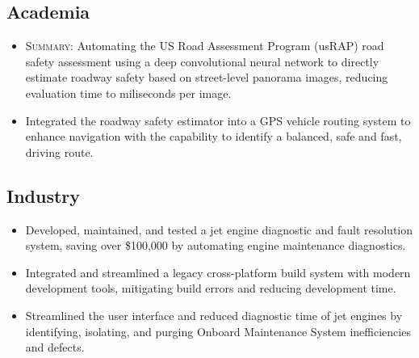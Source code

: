\documentclass[11pt,a4paper,sans]{moderncv} %
\begin{document}
\subsection{Academia}
{
\begin{itemize} 
	\item \textsc{Summary:} Automating the US Road Assessment Program (usRAP) road safety assessment using a deep convolutional neural network to directly estimate roadway safety based on street-level panorama images, reducing evaluation time to miliseconds per image.
	\item Integrated the roadway safety estimator into a GPS vehicle routing system to enhance navigation with the capability to identify a balanced, safe and fast, driving route.
\end{itemize}
}


\subsection{Industry}

{
	\begin{itemize}
		\item Developed, maintained, and tested a jet engine diagnostic and fault resolution system, saving over \$100,000 by automating engine maintenance diagnostics.
		\item Integrated and streamlined a legacy cross-platform build system with modern development tools, mitigating build errors and reducing development time.
	\end{itemize}
}


{
\begin{itemize}
	\item Streamlined the user interface and reduced diagnostic time of jet engines by identifying, isolating, and purging Onboard Maintenance System inefficiencies and defects.
\end{itemize}
}

\end{document}
